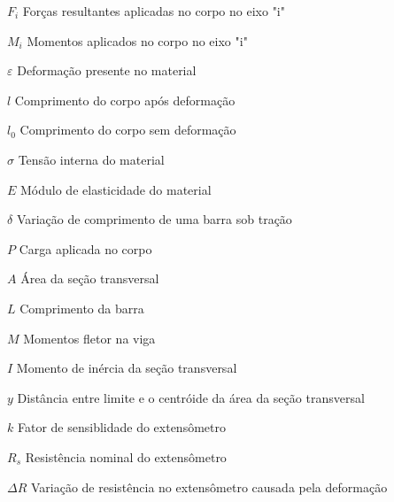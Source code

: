 

\begin{simbolos}

    \item[$ F_{i} $] {Forças resultantes aplicadas no corpo no eixo "i"}
    \item[$ M_{i} $] {Momentos aplicados no corpo no eixo "i"}

    \item[$ \varepsilon $] {Deformação presente no material}
    \item[$ l $] {Comprimento do corpo após deformação}
    \item[$ l_0 $] {Comprimento do corpo sem deformação}

    \item[$ \sigma $] {Tensão interna do material}
    \item[$ E $] {Módulo de elasticidade do material}

    \item[$ \delta $] {Variação de comprimento de uma barra sob tração}
    \item[$ P $] {Carga aplicada no corpo}
    \item[$ A $] {Área da seção transversal}
    \item[$ L $] {Comprimento da barra}

%
%

    \item[$ M $] {Momentos fletor na viga}
    \item[$ I $] {Momento de inércia da seção transversal}
    \item[$ y $] {Distância entre limite e o centróide da área da seção transversal}

    \item[$ k $] {Fator de sensiblidade do extensômetro}
    \item[$ R_s $] {Resistência nominal do extensômetro}
    \item[$ \Delta R $] {Variação de resistência no extensômetro causada pela deformação}


\end{simbolos}
